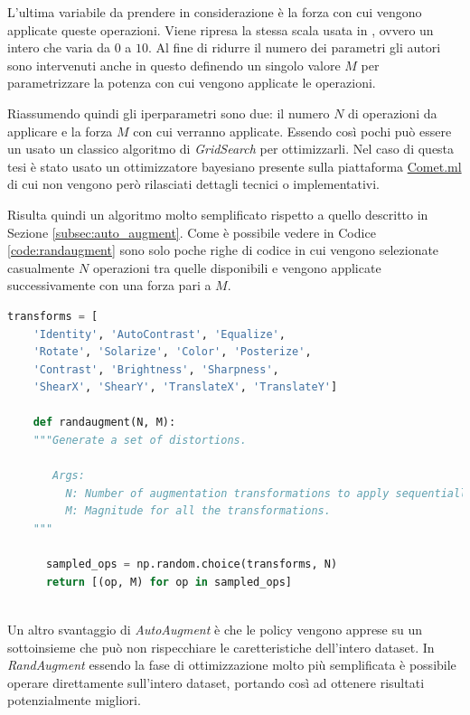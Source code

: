 L'ultima variabile da prendere in considerazione è la forza con cui vengono applicate queste operazioni. Viene ripresa la stessa scala usata in \cite{DBLP:journals/corr/abs-1805-09501}, ovvero un intero che varia da $0$ a $10$.
Al fine di ridurre il numero dei parametri gli autori sono intervenuti anche in questo definendo un singolo valore $M$ per parametrizzare la potenza con cui vengono applicate le operazioni. 

Riassumendo quindi gli iperparametri sono due: il numero $N$ di operazioni da applicare e la forza $M$ con cui verranno applicate. Essendo così pochi può essere un usato un classico algoritmo di \textit{GridSearch} per ottimizzarli. Nel caso di questa tesi è stato usato un ottimizzatore bayesiano presente sulla piattaforma \href{https://www.comet.ml/}{Comet.ml} di cui non vengono però rilasciati dettagli tecnici o implementativi.

Risulta quindi un algoritmo molto semplificato rispetto a quello descritto in Sezione \ref{subsec:auto_augment}. Come è possibile vedere in Codice \ref{code:randaugment} sono solo poche righe di codice in cui vengono selezionate casualmente $N$ operazioni tra quelle disponibili e vengono applicate successivamente con una forza pari a $M$.
\begin{lstlisting}[caption={Algoritmo di RandAugment in Python \cite{DBLP:journals/corr/abs-1909-13719}}, language=Python, label=code:randaugment]
    transforms = [
    'Identity', 'AutoContrast', 'Equalize', 
    'Rotate', 'Solarize', 'Color', 'Posterize',
    'Contrast', 'Brightness', 'Sharpness', 
    'ShearX', 'ShearY', 'TranslateX', 'TranslateY']
    
    def randaugment(N, M): 
    """Generate a set of distortions.
    
       Args:
         N: Number of augmentation transformations to apply sequentially.
         M: Magnitude for all the transformations.
    """
    
      sampled_ops = np.random.choice(transforms, N)
      return [(op, M) for op in sampled_ops]
    
\end{lstlisting}
\label{fig:algorithm}
Un altro svantaggio di \textit{AutoAugment} è che le policy vengono apprese su un sottoinsieme che può non rispecchiare le caretteristiche dell'intero dataset. In \textit{RandAugment} essendo la fase di ottimizzazione molto più semplificata è possibile operare direttamente sull'intero dataset, portando così ad ottenere risultati potenzialmente migliori.

